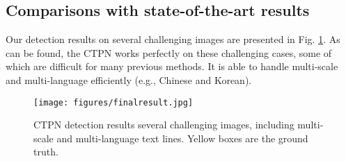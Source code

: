 \documentclass[runningheads]{llncs}
\begin{document}
\subsection{Comparisons with state-of-the-art results}
 Our detection results on several challenging images are presented in Fig. \ref{fig:final}.  As can be found, the CTPN works perfectly on these challenging cases, some of which are difficult for many previous methods.  It is able to handle multi-scale and multi-language efficiently (e.g., Chinese and Korean). \\
 
 \begin{figure}[tb]
\centering
\texttt{[image: figures/finalresult.jpg]}
\caption{CTPN detection results several challenging images, including multi-scale and multi-language text lines. Yellow boxes are the ground truth. }
\label{fig:final}
\end{figure}
\end{document}
